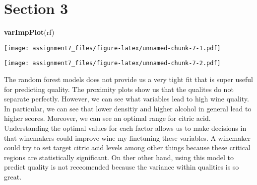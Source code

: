 \documentclass[]{article}
\newenvironment{Shaded}{\begin{snugshade}}{\end{snugshade}}
\newcommand{\KeywordTok}[1]{\textcolor[rgb]{0.13,0.29,0.53}{\textbf{#1}}}
\newcommand{\DataTypeTok}[1]{\textcolor[rgb]{0.13,0.29,0.53}{#1}}
\newcommand{\DecValTok}[1]{\textcolor[rgb]{0.00,0.00,0.81}{#1}}
\newcommand{\OperatorTok}[1]{\textcolor[rgb]{0.81,0.36,0.00}{\textbf{#1}}}
\newcommand{\NormalTok}[1]{#1}
\begin{document}
\section{Section 3}\label{section-3}

\begin{Shaded}
\begin{Highlighting}[]
\KeywordTok{varImpPlot}\NormalTok{(rf)}
\end{Highlighting}
\end{Shaded}

\texttt{[image: assignment7\_files/figure-latex/unnamed-chunk-7-1.pdf]}

\begin{Shaded}
\end{Shaded}

\texttt{[image: assignment7\_files/figure-latex/unnamed-chunk-7-2.pdf]}

The random forest models does not provide us a very tight fit that is
super useful for predicting quality. The proximity plots show us that
the qualites do not separate perfectly. However, we can see what
variables lead to high wine quality. In particular, we can see that
lower densitiy and higher alcohol in general lead to higher scores.
Moreover, we can see an optimal range for citric acid. Understanding the
optimal values for each factor allows us to make decisions in that
winemakers could improve wine my finetuning these variables. A winemaker
could try to set target citric acid levels among other things because
these critical regions are statistically significant. On ther other
hand, using this model to predict quality is not reccomended because the
variance within qualities is so great.
\end{document}
